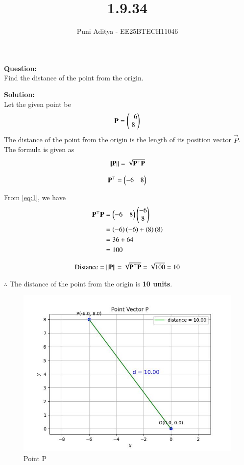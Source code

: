 \documentclass[journal]{IEEEtran}
\begin{document}
\title{1.9.34}
\author{Puni Aditya - EE25BTECH11046}
\maketitle

\textbf{Question:}\\
Find the distance of the point  from the origin.

\textbf{Solution:}\\
Let the given point be
\begin{align*}
    \mathbf{P} = \begin{pmatrix}-6 \\ 8\end{pmatrix}
\end{align*}
The distance of the point from the origin is the length of its position vector $\vec{P}$. The formula is given as 
\begin{align}
\left\lVert\mathbf{P}\right\rVert = \sqrt{\mathbf{P}^\top \mathbf{P}} \label{eq:1}
\end{align}

\begin{align*}
    \mathbf{P}^\top = \begin{pmatrix}-6 & 8\end{pmatrix}
\end{align*}

From \ref{eq:1}, we have
\begin{align}
    \mathbf{P}^\top \mathbf{P} &= \begin{pmatrix}-6 & 8\end{pmatrix} \begin{pmatrix}-6 \\ 8\end{pmatrix} \\
    &= \left(-6\right)\left(-6\right) + \left(8\right)\left(8\right) \\
    &= 36 + 64 \\
    &= 100
\end{align}

\begin{align*}
    \text{Distance} = \left\lVert\mathbf{P}\right\rVert = \sqrt{\mathbf{P}^\top \mathbf{P}} = \sqrt{100} = 10
\end{align*}

$\therefore$ The distance of the point  from the origin is \textbf{10 units}.

\begin{figure}
    \centering
    \includegraphics[width=\columnwidth]{figs/plot_c.jpg}
    \caption*{Point P}
    \label{fig:fig}
\end{figure}
\end{document}
